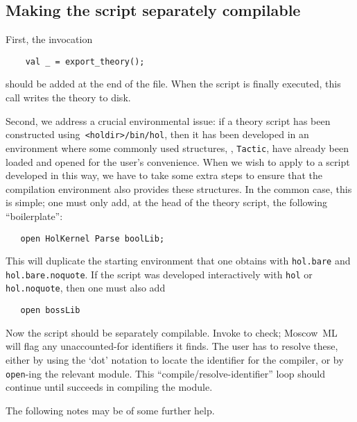 \subsection{Making the script separately compilable}

First, the invocation
\begin{verbatim}
    val _ = export_theory();
\end{verbatim}
should be added at the end of the file. When the script is finally
executed, this call writes the theory to disk.

Second, we address a crucial environmental issue: if a theory script
has been constructed using\verb+ <holdir>/bin/hol+, then it has been
developed in an environment where some commonly used structures, \eg,
\verb+Tactic+, have already been loaded and opened for the user's
convenience. When we wish to apply \holmake{} to a script developed
in this way, we have to take some extra steps to ensure that the
compilation environment also provides these structures.  In the common
case, this is simple; one must only add, at the head of the theory
script, the following ``boilerplate'':
\begin{verbatim}
   open HolKernel Parse boolLib;
\end{verbatim}
This will duplicate the starting environment that one obtains with
\verb+hol.bare+ and \linebreak \verb+hol.bare.noquote+.  If the script was
developed interactively with \texttt{hol} or \texttt{hol.noquote},
then one must also add
\begin{verbatim}
   open bossLib
\end{verbatim}
Now the script should be separately compilable. Invoke \holmake{}
to check; Moscow~ML will flag any unaccounted-for identifiers it finds.
The user has to resolve these, either by using the `dot' notation to
locate the identifier for the compiler, or by \verb+open+-ing the
relevant module. This ``compile/resolve-identifier'' loop should
continue until \holmake{} succeeds in compiling the module.

The following notes may be of some further help.

